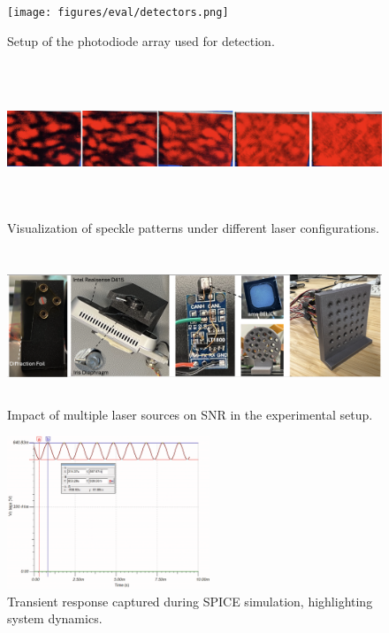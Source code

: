 \begin{figure}[t]
    \centering
    \texttt{[image: figures/eval/detectors.png]}
    \caption{Setup of the photodiode array used for detection.}
    \label{fig:detectors}
\end{figure}


\begin{figure}[t]
    \centering
    \includegraphics[width=\textwidth,height=1.8in]{figures/eval/speckles}
    \caption{Visualization of speckle patterns under different laser configurations.}
    \label{fig:speckles}
\end{figure}

\begin{figure}[t]
    \centering
    \includegraphics[width=\textwidth,height=1.8in]{figures/eval/lasers}
    \caption{Impact of multiple laser sources on SNR in the experimental setup.}
    \label{fig:lasers}
\end{figure}

\begin{figure}[t]
    \centering
    \includegraphics[width=\textwidth,height=1.8in]{figures/eval/transient}
    \caption{Transient response captured during SPICE simulation, highlighting system dynamics.}
    \label{fig:transient}
\end{figure}